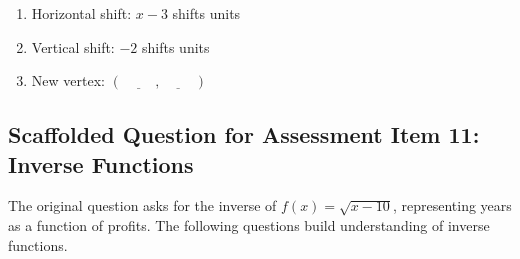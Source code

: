 \documentclass[12pt]{article}
\begin{document}
\begin{enumerate}[label=4.\arabic*]
    \begin{enumerate}[label=\alph*)]
        \item Horizontal shift: \( x - 3 \) shifts \underline{\hspace{1cm}} units \underline{\hspace{1cm}}
        \item Vertical shift: \( -2 \) shifts \underline{\hspace{1cm}} units \underline{\hspace{1cm}}
        \item New vertex: \( (\underline{\hspace{1cm}}, \underline{\hspace{1cm}}) \)
    \end{enumerate}
\end{enumerate}

\subsection*{Scaffolded Question for Assessment Item 11: Inverse Functions}
The original question asks for the inverse of \( f(x) = \sqrt{x - 10} \), representing years as a function of profits. The following questions build understanding of inverse functions.
\end{document}

